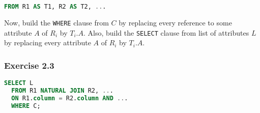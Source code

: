 \documentclass[../../main.tex]{subfiles}
\begin{document}
\begin{lstlisting}[language=sql]
  FROM R1 AS T1, R2 AS T2, ...
\end{lstlisting}

Now, build the \verb|WHERE| clause from $C$ by
replacing every reference to some attribute $A$
of $R_{i}$ by $T_{i}.A$. Also, build the
\verb|SELECT| clause from list of attributes $L$
by replacing every attribute $A$ of $R_{i}$ by
$T_{i}.A$.

\subsubsection*{Exercise 2.3}

\begin{lstlisting}[language=sql]
  SELECT L
  FROM R1 NATURAL JOIN R2, ...
  ON R1.column = R2.column AND ...
  WHERE C;
\end{lstlisting}
\end{document}
